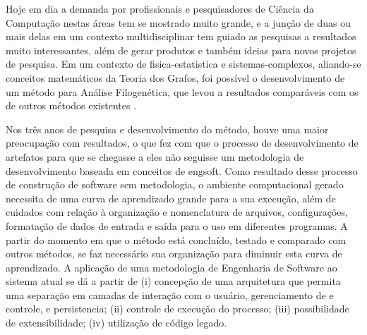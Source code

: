 Hoje em dia a demanda por profissionais e pesquisadores de Ciência da Computação nestas áreas tem se mostrado muito grande, e a junção de duas ou mais delas
em um contexto multidisciplinar tem guiado as pesquisas a resultados muito interessantes, além de gerar produtos e também ideias para novos projetos de
pesquisa. Em um contexto de \gls{fisica-estatistica} e \gls{sistemas-complexos}, aliando-se conceitos matemáticos da Teoria dos Grafos, foi possível o
desenvolvimento de um método para Análise Filogenética, que levou a resultados comparáveis com os de outros métodos existentes \cite{andrade2011}.





Nos três anos de pesquisa e desenvolvimento do método, houve uma maior preocupação com resultados, o que fez com que o processo de desenvolvimento de
\gls{artefatos} para que se chegasse a eles não seguisse um metodologia de desenvolvimento baseada em conceitos de \gls{engsoft}. Como
resultado desse processo de construção de software sem metodologia, o ambiente computacional gerado necessita de
uma curva de aprendizado grande para a sua execução, além de cuidados com relação à organização e nomenclatura de arquivos, configurações,
formatação de dados de entrada e saída para o uso em diferentes programas. A partir do momento em que o método está concluído, testado e comparado com
outros métodos, se faz necessário sua organização para diminuir esta curva de aprendizado. A aplicação de uma metodologia de Engenharia de Software ao
sistema atual se dá a partir de (i) concepção de uma arquitetura que permita uma separação em camadas de interação com o usuário, gerenciamento de
e controle, e \gls{persistencia}; (ii) controle de execução do processo; (iii) possibilidade de extensibilidade; (iv) utilização de código legado.

